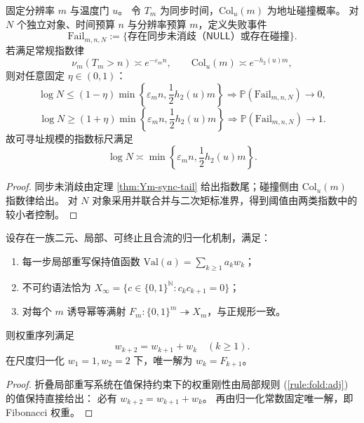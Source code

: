 \begin{theorem}\label{thm:xi-time-resolution-dual-budget-phase-transition}
固定分辨率 \(m\) 与温度门 \(u\)。
令 \(T_m\) 为同步时间，\(\mathrm{Col}_u(m)\) 为地址碰撞概率。
对 \(N\) 个独立对象、时间预算 \(n\) 与分辨率预算 \(m\)，定义失败事件
\[
\mathrm{Fail}_{m,n,N}:=\{\text{存在同步未消歧（\(\mathsf{NULL}\)）或存在碰撞}\}.
\]
若满足常规指数律
\[
\nu_m(T_m>n)\asymp e^{-\varepsilon_m n},
\qquad
\mathrm{Col}_u(m)\asymp e^{-h_2(u)m},
\]
则对任意固定 \(\eta\in(0,1)\)：
\[
\log N\le (1-\eta)\min\!\left\{\varepsilon_m n,\frac12 h_2(u)m\right\}
\Longrightarrow
\mathbb P(\mathrm{Fail}_{m,n,N})\to 0,
\]
\[
\log N\ge (1+\eta)\min\!\left\{\varepsilon_m n,\frac12 h_2(u)m\right\}
\Longrightarrow
\mathbb P(\mathrm{Fail}_{m,n,N})\to 1.
\]
故可寻址规模的指数标尺满足
\[
\log N\asymp \min\!\left\{\varepsilon_m n,\frac12 h_2(u)m\right\}.
\]
\end{theorem}

\begin{proof}
同步未消歧由定理 \ref{thm:Ym-sync-tail} 给出指数尾；碰撞侧由 \(\mathrm{Col}_u(m)\) 指数律给出。
对 \(N\) 对象采用并联合并与二次矩标准界，得到阈值由两类指数中的较小者控制。
\end{proof}

\begin{proposition}\label{prop:xi-local-binary-normalization-fibonacci-rigidity}
设存在一族二元、局部、可终止且合流的归一化机制，满足：
\begin{enumerate}
  \item 每一步局部重写保持值函数 \(\mathrm{Val}(a)=\sum_{k\ge 1}a_k w_k\)；
  \item 不可约语法恰为 \(X_\infty=\{c\in\{0,1\}^{\mathbb N}:c_kc_{k+1}=0\}\)；
  \item 对每个 \(m\) 诱导幂等满射 \(F_m:\{0,1\}^m\twoheadrightarrow X_m\)，与正规形一致。
\end{enumerate}
则权重序列满足
\[
w_{k+2}=w_{k+1}+w_k\quad(k\ge 1).
\]
在尺度归一化 \(w_1=1,w_2=2\) 下，唯一解为 \(w_k=F_{k+1}\)。
\end{proposition}

\begin{proof}
折叠局部重写系统在值保持约束下的权重刚性由局部规则
\textup{(\ref{rule:fold:adj})} 的值保持直接给出：
必有 \(w_{k+2}=w_{k+1}+w_k\)。
再由归一化常数固定唯一解，即 Fibonacci 权重。
\end{proof}

